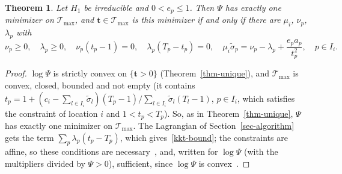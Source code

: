 \documentclass[11pt]{article}
\theoremstyle{plain}
\newtheorem{theorem}{Theorem}[section]
\theoremstyle{remark}
\numberwithin{equation}{section}
\begin{document}
\begin{theorem}\label{thm-unique-bound}
Let $H_1$ be irreducible and $0<e_p\le 1$. Then $\Psi$ has exactly one minimizer
on $\mathcal T_{\max}$, and $\bm t\in\mathcal T_{\max}$ is this minimizer if and only
if there are $\mu_i$, $\nu_p$, $\lambda_p$ with
\begin{equation}\label{kkt-bound}
\nu_p\ge0,\quad\lambda_p\ge0,\quad\nu_p(t_p-1)=0,\quad\lambda_p(T_p-t_p)=0,\quad
\mu_i\widetilde\sigma_p=\nu_p-\lambda_p+\frac{e_pa_p}{t_p^2},\quad p\in I_i .
\end{equation}
\end{theorem}
\begin{proof}
$\log\Psi$ is strictly convex on $\{\bm t>0\}$ (Theorem~\ref{thm-unique}), and
$\mathcal T_{\max}$ is convex, closed, bounded and not empty (it contains
$t_p=1+(c_i-\sum_{l\in I_i}\widetilde\sigma_l)(T_p-1)/\sum_{l\in I_i}\widetilde\sigma_l(T_l-1)$,
$p\in I_i$, which satisfies the constraint of location $i$ and $1<t_p<T_p$). So,
as in Theorem~\ref{thm-unique}, $\Psi$ has exactly one minimizer on
$\mathcal T_{\max}$. The Lagrangian of Section~\ref{sec-algorithm} gets the term
$\sum_p\lambda_p(t_p-T_p)$, which gives~\eqref{kkt-bound}; the constraints are
affine, so these conditions are necessary~\cite[Section~3.4]{1999Bertsekas}, and,
written for $\log\Psi$ (with the multipliers divided by $\Psi>0$), sufficient,
since $\log\Psi$ is convex~\cite[Section~5.5.3]{2004Boyd_Vandenberghe}.
\end{proof}
\end{document}

